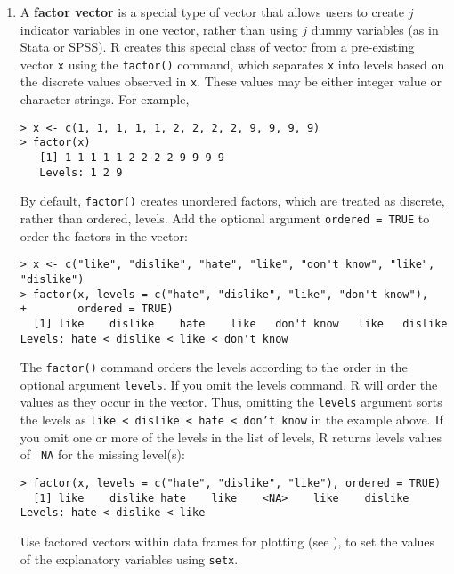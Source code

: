 \begin{enumerate}
\item \label{factors} A {\bf factor vector} is a special type of
vector that allows users to create $j$ indicator variables in one
vector, rather than using $j$ dummy variables (as in Stata or SPSS).  R
creates this special class of vector from a pre-existing vector {\tt x}
using the {\tt factor()} command, which separates {\tt x} into levels
based on the discrete values observed in {\tt x}.  These values may be
either integer value or character strings.  For example,
\begin{verbatim}
> x <- c(1, 1, 1, 1, 1, 2, 2, 2, 2, 9, 9, 9, 9)
> factor(x)
   [1] 1 1 1 1 1 2 2 2 2 9 9 9 9
   Levels: 1 2 9
\end{verbatim}
By default, {\tt factor()} creates unordered factors, which are
  treated as discrete, rather than ordered, levels.  Add the optional
  argument {\tt ordered = TRUE} to order the factors in the vector:
\begin{verbatim}  
> x <- c("like", "dislike", "hate", "like", "don't know", "like", "dislike")
> factor(x, levels = c("hate", "dislike", "like", "don't know"),
+        ordered = TRUE)
  [1] like    dislike    hate    like   don't know   like   dislike   
Levels: hate < dislike < like < don't know
\end{verbatim}
  The {\tt factor()} command orders the levels according to the order in
  the optional argument {\tt levels}.  If you omit the levels command,
  R will order the values as they occur in the vector.  Thus, omitting
  the {\tt levels} argument sorts the levels as {\tt like < dislike <
    hate < don't know} in the example above.  If you omit one or more
  of the levels in the list of levels, R returns levels values of {\tt
    NA} for the missing level(s):
\begin{verbatim}
> factor(x, levels = c("hate", "dislike", "like"), ordered = TRUE)
  [1] like    dislike hate    like    <NA>    like    dislike
Levels: hate < dislike < like
\end{verbatim}
Use factored vectors within data frames for plotting (see
), to set the values of the explanatory variables using
{\tt setx}.  


\end{enumerate}
